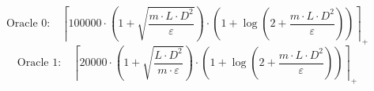 \[\text{Oracle 0:}\quad \left\lceil 100000 \cdot \left(1 + \sqrt{\frac{m \cdot L \cdot D^{2}}{\varepsilon}}\right) \cdot \left(1 + \log\left(2 + \frac{m \cdot L \cdot D^{2}}{\varepsilon}\right)\right) \right\rceil_{+}\]
\[\text{Oracle 1:}\quad \left\lceil 20000 \cdot \left(1 + \sqrt{\frac{L \cdot D^{2}}{m \cdot \varepsilon}}\right) \cdot \left(1 + \log\left(2 + \frac{m \cdot L \cdot D^{2}}{\varepsilon}\right)\right) \right\rceil_{+}\]

